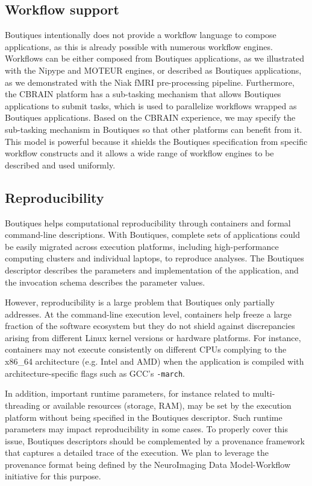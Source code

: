 \documentclass[a4paper,num-refs]{oup-contemporary}
\newcommand{\boutiques}{Boutiques\xspace}
\begin{document}
\subsection{Workflow support}

\boutiques intentionally does not provide a workflow language to
compose applications, as this is already possible with numerous
workflow engines. Workflows can be either composed from \boutiques
applications, as we illustrated with the Nipype and MOTEUR engines, or
described as \boutiques applications, as we demonstrated with the Niak
fMRI pre-processing pipeline. Furthermore, the CBRAIN platform has a
sub-tasking mechanism that allows \boutiques applications to submit
tasks, which is used to parallelize workflows wrapped as \boutiques
applications. Based on the CBRAIN experience, we may specify the
sub-tasking mechanism in \boutiques so that other platforms can
benefit from it.  This model is powerful because it shields the
\boutiques specification from specific workflow constructs and it allows
a wide range of workflow engines to be described and used uniformly.


\subsection{Reproducibility}

\boutiques helps computational reproducibility through containers and formal
command-line descriptions. With \boutiques, complete sets of
applications could be easily migrated across execution platforms,
including high-performance computing clusters and individual laptops,
to reproduce analyses. The \boutiques descriptor describes the
parameters and implementation of the application, and the invocation
schema describes the parameter values.

However, reproducibility is a large problem that \boutiques only
partially addresses. At the command-line execution level, containers
help freeze a large fraction of the software ecosystem but they do not
shield against discrepancies arising from different Linux kernel
versions or hardware platforms. For instance, containers may not
execute consistently on different CPUs complying to the x86\_64
architecture (e.g. Intel and AMD) when the application is compiled with
architecture-specific flags such as GCC's \texttt{-march}.

In addition, important runtime parameters, for instance related to
multi-threading or available resources (storage, RAM), may be set by
the execution platform without being specified in the \boutiques
descriptor. Such runtime parameters may impact reproducibility in some
cases. To properly cover this issue, \boutiques descriptors should be
complemented by a provenance framework that captures a detailed trace
of the execution. We plan to leverage the provenance format being
defined by the NeuroImaging Data
Model-Workflow~\cite{ghosh2017capturing} initiative for this purpose.
\end{document}
